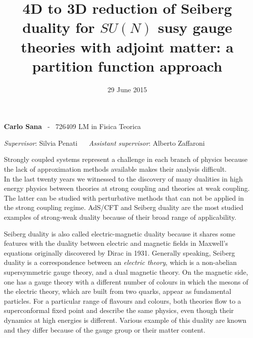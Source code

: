 \documentclass[a4paper,12pt]{article}
\date{}
\title{ \textbf{4D to 3D reduction of Seiberg duality for $SU(N)$ susy gauge theories with adjoint matter: a partition function approach }}
\date{29 June 2015}
\begin{document}
\maketitle
\vspace*{-1.5cm}
	 \textbf{Carlo Sana}  ~-~ 726409  \hfill
 LM in Fisica Teorica 
\\
\vspace{-0.5cm}
\begin{center}
\textit{Supervisor}: 
\textsf{Silvia Penati} 
~~
\textit{Assistant supervisor}:
\textsf{Alberto Zaffaroni}

\end{center}



Strongly coupled systems represent a challenge in each branch of physics because the lack of approximation methods available makes their analysis difficult.\\
In the last twenty years we witnessed to the discovery of many dualities in high energy physics between theories at strong coupling and theories at weak coupling.
The latter can be studied with perturbative methods that can not be applied in the strong coupling regime.
AdS/CFT and Seiberg duality are the most studied examples of strong-weak duality because of their broad range of applicability.

Seiberg duality is also called electric-magnetic duality because it shares some features with the duality between electric and magnetic fields in Maxwell's equations originally discovered by Dirac in 1931.
Generally speaking, Seiberg duality is a correspondence between an \emph{electric theory}, which is a non-abelian supersymmetric gauge theory, and a dual magnetic theory. 
On the magnetic side, one has a gauge theory with a different number of colours  in which the mesons of the electric theory, which are built from two quarks, appear as fundamental particles.
For a particular range of flavours and colours, both theories flow to a superconformal fixed point and describe the same physics, even though their dynamics at high energies is different.
Various example of this duality are known and they differ because of the gauge group or their matter content.
\end{document}
